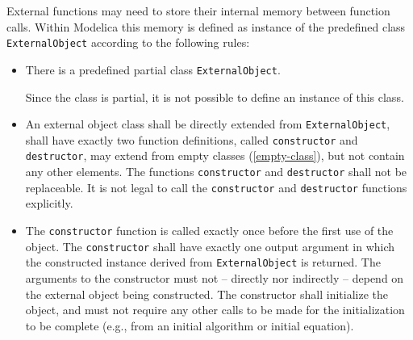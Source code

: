 External functions may need to store their internal memory between function calls.
Within Modelica this memory is defined as instance of the predefined class {\lstinline!ExternalObject!} according to the following rules:
\begin{itemize}
\item
  There is a predefined partial class {\lstinline!ExternalObject!}.
  \begin{nonnormative}
  Since the class is partial, it is not possible to define an instance of this class.
  \end{nonnormative}
\item
  An external object class shall be directly extended from {\lstinline!ExternalObject!}, shall have exactly two function definitions, called {\lstinline!constructor!} and {\lstinline!destructor!}, may extend from empty classes (\cref{empty-class}), but not contain any other elements.
  The functions {\lstinline!constructor!} and {\lstinline!destructor!} shall not be replaceable.
  It is not legal to call the {\lstinline!constructor!} and {\lstinline!destructor!} functions explicitly.
\item
  The {\lstinline!constructor!} function is called exactly once before the first use of the object.
  The {\lstinline!constructor!} shall have exactly one output argument in which the constructed instance derived from {\lstinline!ExternalObject!} is returned.
  The arguments to the constructor must not -- directly nor indirectly -- depend on the external object being constructed.
  The constructor shall initialize the object, and must not require any other calls to be made for the initialization to be complete (e.g., from an initial algorithm or initial equation).


\end{itemize}
